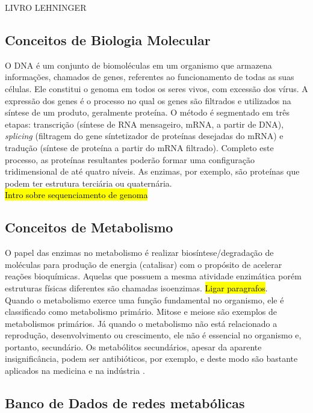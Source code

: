 \documentclass[conference]{IEEEtran}
\begin{document}
LIVRO LEHNINGER

\subsection{Conceitos de Biologia Molecular}

O DNA é um conjunto de biomoléculas em um organismo que armazena informações, chamados de genes, referentes ao funcionamento de todas as suas células. Ele constitui o genoma em todos os seres vivos, com excessão dos vírus. A expressão dos genes é o processo no qual os genes são filtrados e utilizados na síntese de um produto, geralmente proteína. O método é segmentado em três etapas: transcrição (síntese de RNA mensageiro, mRNA, a partir de DNA), \textit{splicing} (filtragem do gene síntetizador de proteínas desejadas do mRNA) e tradução (síntese de proteína a partir do mRNA filtrado). Completo este processo, as proteínas resultantes poderão formar uma configuração tridimensional de até quatro níveis. As enzimas, por exemplo, são proteínas que podem ter estrutura terciária ou quaternária. \\
\indent \hl{Intro sobre sequenciamento de genoma} \\

\subsection{Conceitos de Metabolismo}

O papel das enzimas no metabolismo é realizar biosíntese/degradação de moléculas para produção de energia (catalisar) com o propósito de acelerar reações bioquímicas. Aquelas que possuem a mesma atividade enzimática porém estruturas físicas diferentes são chamadas isoenzimas. \hl{Ligar paragrafos}.  \\
\indent Quando o metabolismo exerce uma função fundamental no organismo, ele é classificado como metabolismo primário. Mitose e meiose são exemplos de metabolismos primários. Já quando o metabolismo não está relacionado a reprodução, desenvolvimento ou crescimento, ele não é essencial no organismo e, portanto, secundário. Os metabólitos secundários, apesar da aparente insignificância, podem ser antibióticos, por exemplo, e deste modo são bastante aplicados na medicina e na indústria \cite{waldeyr}.

\subsection{Banco de Dados de redes metabólicas}
\end{document}
